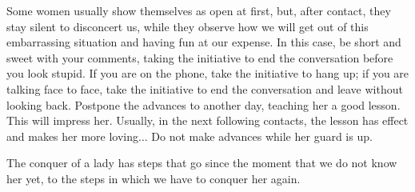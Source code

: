 \par Some women usually show themselves as open at first, but, after contact, they stay silent to disconcert us, while they observe how we will get out of this embarrassing situation and having fun at our expense. In this case, be short and sweet with your comments, taking the initiative to end the conversation before you look stupid. If you are on the phone, take the initiative to hang up; if you are talking face to face, take the initiative to end the conversation and leave without looking back. Postpone the advances to another day, teaching her a good lesson. This will impress her. Usually, in the next following contacts, the lesson has effect and makes her more loving... Do not make advances while her guard is up.
 
\par The conquer of a lady has steps that go since the moment that we do not know her yet, to the steps in which we have to conquer her again.